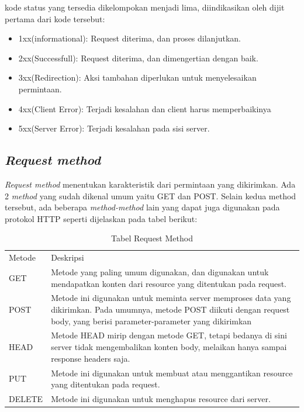 kode status yang tersedia dikelompokan menjadi lima, diindikasikan oleh dijit pertama dari kode tersebut:
\begin{itemize}
	\item 1xx(informational): Request diterima, dan proses dilanjutkan.
	\item 2xx(Successfull): Request diterima, dan dimengertian dengan baik.
	\item 3xx(Redirection): Aksi tambahan diperlukan untuk menyelesaikan permintaan.
	\item 4xx(Client Error): Terjadi kesalahan dan client harus memperbaikinya
	\item 5xx(Server Error):  Terjadi kesalahan pada sisi server.
\end{itemize}

\subsection{\textit{Request method}}
\label{subsec:requestmethod}

\textit{Request method} menentukan karakteristik dari permintaan yang dikirimkan. Ada 2 \textit{method} yang sudah dikenal umum yaitu GET dan POST. Selain kedua method tersebut, ada beberapa \textit{method-method} lain yang dapat juga digunakan pada protokol HTTP seperti dijelaskan pada tabel berikut: 

\begin{table}[H]
\centering
\begin{tabular}{|p{3cm}|p{6cm}|}
Metode & Deskripsi                                                                                                                                                                        \\
GET    & Metode yang paling umum digunakan, dan digunakan untuk mendapatkan konten dari resource yang ditentukan pada request.                                                            \\
POST   & Metode ini digunakan untuk meminta server memproses data yang dikirimkan. Pada umumnya, metode POST diikuti dengan request body, yang berisi parameter-parameter yang dikirimkan \\
HEAD   & Metode HEAD mirip dengan metode GET, tetapi bedanya di sini server tidak mengembalikan konten body, melaikan hanya sampai response headers saja.                                 \\
PUT    & Metode ini digunakan untuk membuat atau menggantikan resource yang ditentukan pada request.                                                                                      \\
DELETE & Metode ini digunakan untuk menghapus resource dari server.                                                                                                                    \caption[Tabel Request Method]{Tabel Request Method}
\label{table:requestmethod}
  
\end{tabular}
\end{table}



